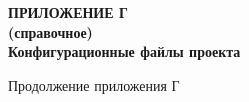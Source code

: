   \newpage
  
  \begin{center}
  \textbf{
  \MakeUppercase{Приложение Г}\\
  (справочное)\\
  \vspace{1em}
  Конфигурационные файлы проекта}
  \end{center}
  
  
  \newpage
  \begin{center}
    Продолжение приложения Г
    \end{center}
  